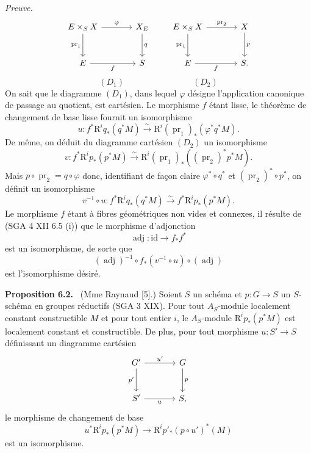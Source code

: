 \documentclass[11pt]{article}
\newenvironment{statement}[1]{\par\medskip\noindent\textbf{#1.}\ }{\par\medskip}
\newcommand{\R}{\mathrm{R}}\newcommand{\RHomCore}{\mathrm{RHom}}
\providecommand{\pr}{\operatorname{pr}}
\providecommand{\R}{\mathrm R}
\providecommand{\pr}{\operatorname{pr}}
\begin{document}
\emph{Preuve.}
\[
\begin{tikzcd}[column sep=large,row sep=large]
E\times_S X \arrow[r,"\varphi"] \arrow[d,"\pr_1"'] & X_E \arrow[d,"q"]\\
E \arrow[r,"f"'] & S
\end{tikzcd}
\qquad
\begin{tikzcd}[column sep=large,row sep=large]
E\times_S X \arrow[r,"\pr_2"] \arrow[d,"\pr_1"'] & X \arrow[d,"p"]\\
E \arrow[r,"f"'] & S .
\end{tikzcd}
\]
\[
(D_1)\qquad\qquad\qquad\qquad(D_2)
\]
On sait que le diagramme $(D_1)$, dans lequel $\varphi$ désigne l'application canonique de passage au quotient, est cartésien. Le morphisme $f$ étant lisse, le théorème de changement de base lisse fournit un isomorphisme
\[
u:f^*\R^iq_*(q^*M)\xrightarrow{\sim}\R^i(\pr_1)_*(\varphi^*q^*M).
\]
De même, on déduit du diagramme cartésien $(D_2)$ un isomorphisme
\[
v:f^*\R^ip_*(p^*M)\xrightarrow{\sim}\R^i(\pr_1)_*((\pr_2)^*p^*M).
\]
Mais $p\circ\pr_2=q\circ\varphi$ donc, identifiant de façon claire $\varphi^*\circ q^*$ et $(\pr_2)^*\circ p^*$, on définit un isomorphisme
\[
v^{-1}\circ u:f^*\R^iq_*(q^*M)\xrightarrow{\sim} f^*\R^ip_*(p^*M).
\]
Le morphisme $f$ étant à fibres géométriques non vides et connexes, il résulte de (SGA 4 XII 6.5 (i)) que le morphisme d'adjonction
\[
\operatorname{adj}:\mathrm{id}\to f_*f^*
\]
est un isomorphisme, de sorte que
\[
(\operatorname{adj})^{-1}\circ f_*(v^{-1}\circ u)\circ(\operatorname{adj})
\]
est l'isomorphisme désiré.

\begin{statement}{Proposition 6.2}
(Mme Raynaud [5].) Soient $S$ un schéma et $p:G\to S$ un $S$-schéma en groupes réductifs (SGA 3 XIX). Pour tout $A_S$-module localement constant constructible $M$ et pour tout entier $i$, le $A_S$-module $\R^ip_*(p^*M)$ est localement constant et constructible. De plus, pour tout morphisme $u:S'\to S$ définissant un diagramme cartésien
\[
\begin{tikzcd}[column sep=large,row sep=large]
G' \arrow[r,"u'"] \arrow[d,"p'"'] & G \arrow[d,"p"]\\
S' \arrow[r,"u"'] & S,
\end{tikzcd}
\]
le morphisme de changement de base
\[
u^*\R^ip_*(p^*M)\to \R^ip'_*(p\circ u')^*(M)
\]
est un isomorphisme.
\end{statement}
\end{document}
